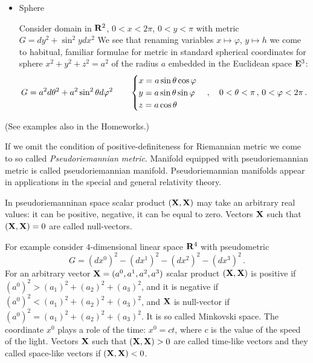 \documentclass[12pt]{article}
\theoremstyle{theorem}
\numberwithin{equation}{section}
\begin{document}
\begin{itemize}
 \item  Sphere

   Consider domain in ${\bf R}^2$,  $0<x<2\pi$, $0<y<\pi$ 
with metric $G=dy^2+\sin^2 y dx^2$
We see that renaming variables $x\mapsto \varphi $, $y\mapsto h$ we come to habitual, familiar formulae for
metric in standard spherical coordinates
for sphere $x^2+y^2+z^2=a^2$ of the radius $a$ embedded in the Euclidean space ${\bf E}^3$:
           \begin{equation}\label{domainascylinder2}
          G= a^2d\theta^2+a^2\sin^2\theta
          d\varphi^2\qquad
          \begin{cases}
          x=a\sin\theta\cos\varphi\cr
          y=a\sin\theta\sin\varphi\cr
          z=a\cos\theta\cr
          \end {cases},
      \quad 0<\theta<\pi\,,\,
          0< \varphi <2\pi\,.
           \end{equation}

\end{itemize}
(See examples also in the Homeworks.)


{\footnotesize If we omit the
condition of positive-definiteness for Riemannian metric we come to so
called  {\it Pseudoriemannian metric}.
Manifold equipped with pseudoriemannian metric is called
pseudoriemannian manifold.  Pseudoriemannian manifolds
appear in applications in the special and general
relativity theory.

In pseudoriemanninan space scalar product $({\bf X},{\bf X})$ may take an arbitrary real
values: it can be positive, negative, it can be equal to zero. Vectors
${\bf X}$ such that $({\bf X},{\bf X})=0$ are called null-vectors.


For example consider $4$-dimensional
linear space ${\bf R}^4$ with pseudometric
           $$
    G=(dx^0)^2-(dx^1)^2-(dx^2)^2-(dx^3)^2\,.
            $$
 For an arbitrary vector ${\bf X}=(a^0,a^1,a^2,a^3)$
scalar product $({\bf X},{\bf X})$ is positive if
$(a^0)^2>(a_1)^2+(a_2)^2+(a_3)^2$, and it is negative if
$(a^0)^2<(a_1)^2+(a_2)^2+(a_3)^2$, and
${\bf X}$ is null-vector if  $(a^0)^2=(a_1)^2+(a_2)^2+(a_3)^2$.
It is so called Minkovski space.
The coordinate $x^0$ plays a
role of the time: $x^0=ct$, where $c$ is
the value of the speed of the light. 
Vectors ${\bf X}$ such that $({\bf X},{\bf X})>0$
are called time-like vectors and they called space-like vectors
if $({\bf X},{\bf X})<0$.} 





\end{document}

